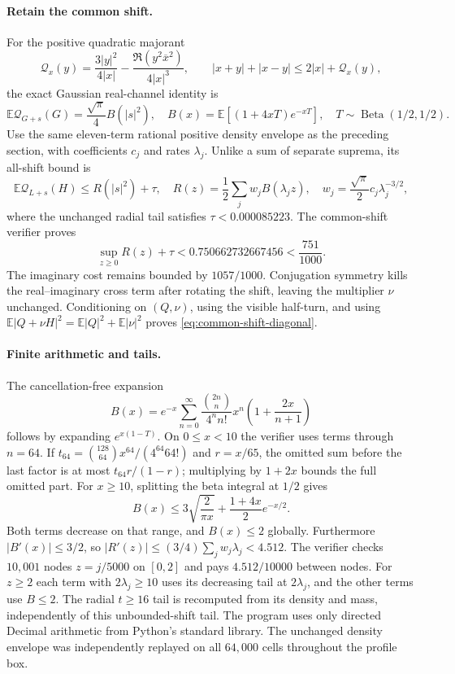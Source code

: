 \paragraph{Retain the common shift.}
For the positive quadratic majorant
\[
 \mathcal Q_x(y)=\frac{3|y|^2}{4|x|}
 -\frac{\Re(y^2\overline x^2)}{4|x|^3},
 \qquad |x+y|+|x-y|\le2|x|+\mathcal Q_x(y),
\]
the exact Gaussian real-channel identity is
\[
 \mathbb E\mathcal Q_{G+s}(G)=\frac{\sqrt\pi}{4}B(|s|^2),
 \quad B(x)=\mathbb E[(1+4xT)e^{-xT}],\quad
 T\sim\operatorname{Beta}(1/2,1/2).
\]
Use the same eleven-term rational positive density envelope as the
preceding section, with coefficients $c_j$ and rates $\lambda_j$.
Unlike a sum of separate suprema, its all-shift bound is
\[
 \mathbb E\mathcal Q_{L+s}(H)\le R(|s|^2)+\tau,
 \quad R(z)=\frac12\sum_j w_j B(\lambda_j z),
 \quad w_j=\frac{\sqrt\pi}{2}c_j\lambda_j^{-3/2},
\]
where the unchanged radial tail satisfies $\tau<0.000085223$.
The common-shift verifier proves
\[
 \sup_{z\ge0}R(z)+\tau
 <0.750662732667456<\frac{751}{1000}.
\]
The imaginary cost remains bounded by $1057/1000$. Conjugation symmetry
kills the real--imaginary cross term after rotating the shift, leaving the
multiplier $\nu$ unchanged. Conditioning on $(Q,\nu)$, using the visible
half-turn, and using
$\mathbb E|Q+\nu H|^2=\mathbb E|Q|^2+\mathbb E|\nu|^2$
proves \eqref{eq:common-shift-diagonal}.

\paragraph{Finite arithmetic and tails.}
The cancellation-free expansion
\[
 B(x)=e^{-x}\sum_{n=0}^\infty
 \frac{\binom{2n}{n}}{4^n n!}x^n
 \left(1+\frac{2x}{n+1}\right)
\]
follows by expanding $e^{x(1-T)}$. On $0\le x<10$ the verifier uses
terms through $n=64$. If $t_{64}=\binom{128}{64}x^{64}/(4^{64}64!)$
and $r=x/65$, the omitted sum before the last factor is at most
$t_{64}r/(1-r)$; multiplying by $1+2x$ bounds the full omitted part.
For $x\ge10$, splitting the beta integral at $1/2$ gives
\[
 B(x)\le3\sqrt{\frac{2}{\pi x}}+
          \frac{1+4x}{2}e^{-x/2}.
\]
Both terms decrease on that range, and $B(x)\le2$ globally.
Furthermore $|B'(x)|\le3/2$, so
$|R'(z)|\le(3/4)\sum_j w_j\lambda_j<4.512$.
The verifier checks $10{,}001$ nodes $z=j/5000$ on $[0,2]$ and pays
$4.512/10000$ between nodes. For $z\ge2$ each term with
$2\lambda_j\ge10$ uses its decreasing tail at $2\lambda_j$, and the
other terms use $B\le2$. The radial $t\ge16$ tail is recomputed from
its density and mass, independently of this unbounded-shift tail.
The program uses only directed Decimal arithmetic from Python's standard
library. The unchanged density envelope was independently replayed on all
$64{,}000$ cells throughout the profile box.

